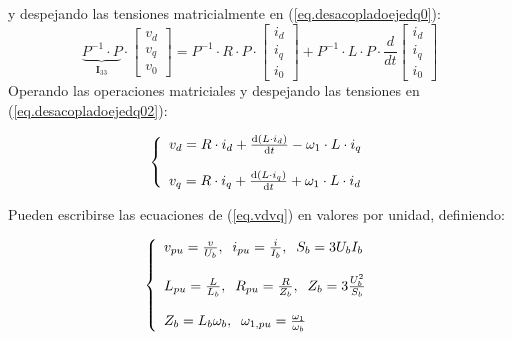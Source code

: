 \documentclass{report}
\begin{document}
y despejando las tensiones matricialmente en (\ref{eq.desacopladoejedq0}):
\begin{equation}
\underbrace{P^{-1} \cdot P}_{\mathbf{I}_{33}} \cdot \left[\begin{array}{c}v_{d} \\ v_{q} \\ v_{0}\end{array}\right] = P^{-1} \cdot R \cdot P \cdot \left[\begin{array}{c}i_{d} \\ i_{q} \\ i_{0}\end{array}\right]+ P^{-1} \cdot L \cdot P \cdot \frac{d}{dt} \left[\begin{array}{c}i_{d} \\ i_{q} \\ i_{0}\end{array}\right]  \label{eq.desacopladoejedq02}
\end{equation}
Operando las operaciones matriciales y despejando las tensiones en (\ref{eq.desacopladoejedq02}):

\begin{equation}
    \left\{\begin{array}{l}
    v_{d} = R \cdot i_{d} + \frac{\mathrm{d}({L \cdot i_{d}})}{\mathrm{d} t} - \omega_{1} \cdot L \cdot i_{q}
    \\
    \null \\
    v_{q} = R \cdot i_{q} + \frac{\mathrm{d}({L \cdot i_{q}})}{\mathrm{d} t} + \omega_{1} \cdot L\cdot i_{d} \end{array} \right.\label{eq.vdvq} 
\end{equation}


Pueden escribirse las ecuaciones de (\ref{eq.vdvq}) en valores por unidad, definiendo:

\begin{equation}
    \left\{\begin{array}{l} 
    v_{pu}= \frac{v}{U_{b}}, \;\; i_{pu}= \frac{i}{I_{b}}, \;\; S_{b} = 3 U_{b}I_{b}  \\ \null  \\
    L_{pu} = \frac{L}{L_{b}}, \;\; R_{pu} = \frac{R}{Z_{b}},\;\; Z_{b} = 3\frac{U_{b}^{2}}{S_{b}} \\ \null \\
    Z_{b} = L_{b} \omega_{b}, \;\; \omega_{1,pu} = \frac{\omega_{1}}{\omega_{b}}
    \end{array} \right.
    \end{equation}
\end{document}
